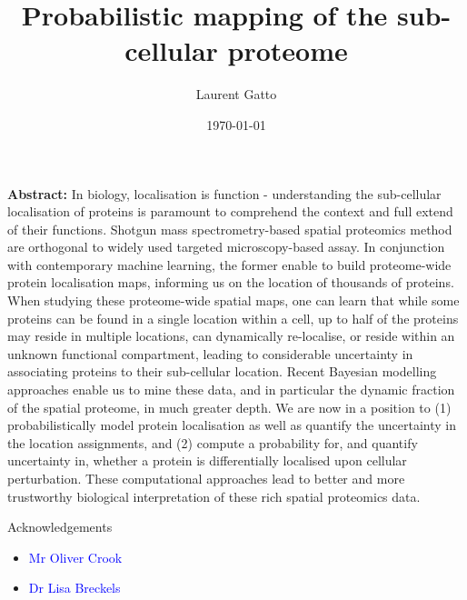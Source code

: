 \documentclass{beamer}
\title{Probabilistic mapping  of the sub-cellular proteome}
\author[]{Laurent Gatto}
\date{\today}
\institute[]{CBIO, de Duve Institute, UCLouvain}
\theoremstyle{example}
\begin{document}



\begin{frame}[plain]
\titlepage
\end{frame}


\begin{frame}%


\justify

{\small \textbf{Abstract:} In biology, localisation is function -
  understanding the sub-cellular localisation of proteins is paramount
  to comprehend the context and full extend of their
  functions. Shotgun mass spectrometry-based spatial proteomics method
  are orthogonal to widely used targeted microscopy-based assay. In
  conjunction with contemporary machine learning, the former enable to
  build proteome-wide protein localisation maps, informing us on the
  location of thousands of proteins. When studying these proteome-wide
  spatial maps, one can learn that while some proteins can be found in
  a single location within a cell, up to half of the proteins may
  reside in multiple locations, can dynamically re-localise, or reside
  within an unknown functional compartment, leading to considerable
  uncertainty in associating proteins to their sub-cellular
  location. Recent Bayesian modelling approaches enable us to mine
  these data, and in particular the dynamic fraction of the spatial
  proteome, in much greater depth. We are now in a position to (1)
  probabilistically model protein localisation as well as quantify the
  uncertainty in the location assignments, and (2) compute a
  probability for, and quantify uncertainty in, whether a protein is
  differentially localised upon cellular perturbation. These
  computational approaches lead to better and more trustworthy
  biological interpretation of these rich spatial proteomics data.  }


\end{frame}


\begin{frame}{Acknowledgements}

  \begin{itemize}

  \item \textcolor{Blue}{Mr Oliver Crook}

  \item \textcolor{Blue}{Dr Lisa Breckels}

  \end{itemize}


\end{frame}
\end{document}
